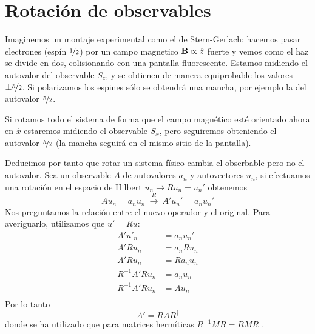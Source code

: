 \section{Rotación de observables}
Imaginemos un montaje experimental como el de Stern-Gerlach; hacemos
pasar electrones (espín ${\nicefrac{1}{2}}$) por un campo magnetico
$\bm{\mathrm{B}}\propto \hat{z}$
fuerte y vemos como el haz se divide en dos, colisionando con una
pantalla fluorescente. Estamos midiendo el
autovalor del observable $S_z$, y se obtienen de manera equiprobable
los valores $\pm \nicefrac{\hbar}{2}$. Si polarizamos los espines
sólo se obtendrá una mancha, por ejemplo la del autovalor $\nicefrac{\hbar}{2}$.

Si rotamos todo el sistema de forma que el campo magnético esté
orientado ahora en $\hat{x}$ estaremos midiendo el observable $S_x$,
pero seguiremos obteniendo el autovalor $\nicefrac{\hbar}{2}$ (la
mancha seguirá en el mismo sitio de la pantalla).

Deducimos por tanto que rotar un sistema
físico cambia el
obserbable
pero no el autovalor. Sea un observable $A$ de autovalores $a_n$ y
autovectores $u_n$, si efectuamos una rotación en el espacio de
Hilbert $u_n \to Ru_n = u_n'$ obtenemos
\begin{equation}
  A u_n = a_n u_n \ \stackrel{R}{\rightarrow} \ A'u_n' = a_n u_n'
\end{equation}
Nos preguntamos la relación entre el nuevo operador y el original.
Para averiguarlo, utilizamos que $u' = Ru$:
\begin{equation}
  \begin{split}
    A' u'_n &= a_n u_n' \\
    A' Ru_n &= a_n Ru_n \\
    A' Ru_n &= R a_n u_n \\
    R^{-1}A' Ru_n &=  a_n u_n  \\
    R^{-1}A' Ru_n &=  A u_n  \\
  \end{split}
\end{equation}
Por lo tanto
\begin{equation}
  \boxed{A' = R A R^\dagger}
\end{equation}
donde se ha utilizado que para matrices hermíticas $R^{-1}MR=RMR^\dagger$.

